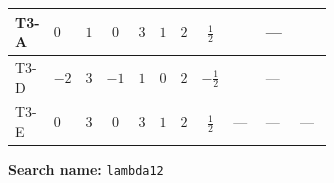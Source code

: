 \documentclass[8pt]{article}
\begin{document}
\begin{landscape}
\begin{longtable}{@{}llcccccc >{\raggedright\arraybackslash}p{0.21\linewidth} >{\raggedright\arraybackslash}p{0.21\linewidth} >{\raggedright\arraybackslash}p{0.21\linewidth}@{}}
\midrule
T3-A & $0$ & $1$ & $0$ & $3$ & $1$ & $2$ & $\frac{1}{2}$ & \scriptsize\adjustbox{max width=\linewidth}{$\begin{gathered} -12 {g_2}^2 {\lambda_{12}}\end{gathered}$} & --- & \scriptsize\adjustbox{max width=\linewidth}{$\begin{gathered} -6 {g_Y}^2 {\lambda_{12}}\end{gathered}$} \\
\midrule
T3-D & $-2$ & $3$ & $-1$ & $1$ & $0$ & $2$ & $-\frac{1}{2}$ & \scriptsize\adjustbox{max width=\linewidth}{$\begin{gathered} -12 {g_2}^2 {\lambda_{12}}\end{gathered}$} & --- & \scriptsize\adjustbox{max width=\linewidth}{$\begin{gathered} -6 {g_Y}^2 {\lambda_{12}}\end{gathered}$} \\
\midrule
T3-E & $0$ & $3$ & $0$ & $3$ & $1$ & $2$ & $\frac{1}{2}$ & --- & --- & --- \\
\midrule
\bottomrule
\end{longtable}
\clearpage
\noindent\textbf{Search name: }\texttt{lambda12}\par\smallskip

\end{landscape}
\end{document}
